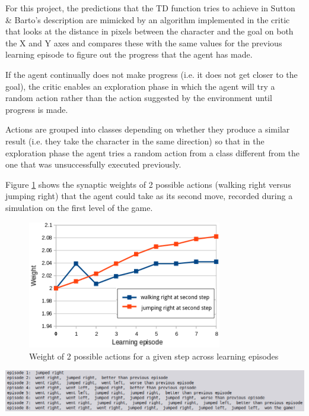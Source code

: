 \documentclass[10pt]{article}
\begin{document}
    For this project, the predictions that the TD function tries to achieve in Sutton \& Barto's description are mimicked by an algorithm implemented in the critic that looks at the distance in pixels between the character and the goal on both the X and Y axes and compares these with the same values for the previous learning episode to figure out the progress that the agent has made.

    If the agent continually does not make progress (i.e. it does not get closer to the goal), the critic enables an exploration phase in which the agent will try a random action rather than the action suggested by the environment until progress is made.

    Actions are grouped into classes depending on whether they produce a similar result (i.e. they take the character in the same direction) so that in the exploration phase the agent tries a random action from a class different from the one that was unsuccessfully executed previously.

    Figure \ref{fig:learning} shows the synaptic weights of 2 possible actions (walking right versus jumping right) that the agent could take as its second move, recorded during a simulation on the first level of the game. 
    
    \begin{figure}[ht!]
    \centering
    \includegraphics[width=85mm]{./learning.png}
    \caption{Weight of 2 possible actions for a given step across learning episodes}
    \label{fig:learning}
    \end{figure}
    \setcounter{figure}{9}

    \setcounter{suppfigure}{8}
    \begin{suppfigure*}
    \center
    \includegraphics[width=180mm]{./history.png}
    \caption{Logs showing the activity of the agent and the evaluation of the critic over learning episodes}
    \label{fig:history}
    \end{suppfigure*}
    
\end{document}
